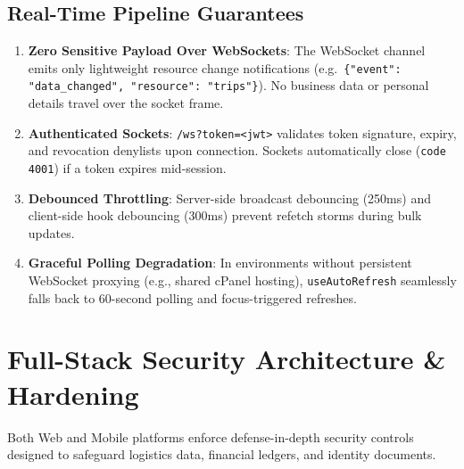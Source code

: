 \documentclass[11pt,a4paper]{article}
\begin{document}
\subsection{Real-Time Pipeline Guarantees}
\begin{enumerate}[leftmargin=1.4em,itemsep=3pt]
  \item \textbf{Zero Sensitive Payload Over WebSockets}: The WebSocket channel emits only lightweight resource change notifications (e.g.\ \texttt{\{"event": "data\_changed", "resource": "trips"\}}). No business data or personal details travel over the socket frame.
  \item \textbf{Authenticated Sockets}: \texttt{/ws?token=<jwt>} validates token signature, expiry, and revocation denylists upon connection. Sockets automatically close (\texttt{code 4001}) if a token expires mid-session.
  \item \textbf{Debounced Throttling}: Server-side broadcast debouncing (250ms) and client-side hook debouncing (300ms) prevent refetch storms during bulk updates.
  \item \textbf{Graceful Polling Degradation}: In environments without persistent WebSocket proxying (e.g., shared cPanel hosting), \texttt{useAutoRefresh} seamlessly falls back to 60-second polling and focus-triggered refreshes.
\end{enumerate}

\section{Full-Stack Security Architecture \& Hardening}

Both Web and Mobile platforms enforce defense-in-depth security controls designed to safeguard logistics data, financial ledgers, and identity documents.
\end{document}
